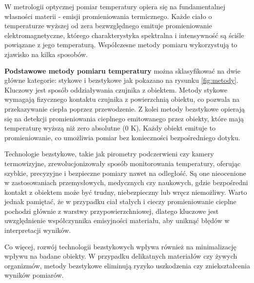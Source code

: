 \vspace{12pt}

W metrologii optycznej pomiar temperatury opiera się na fundamentalnej własności materii - emisji promieniowania termicznego. Każde ciało o temperaturze wyższej od zera bezwzględnego emituje promieniowanie elektromagnetyczne, którego charakterystyka spektralna i intensywność są ściśle powiązane z jego temperaturą. Współczesne metody pomiaru wykorzystują to zjawisko na kilka sposobów.


\vspace{12pt}

\textbf{Podstawowe metody pomiaru temperatury} można sklasyfikować na dwie główne kategorie: stykowe i bezstykowe jak pokazano na rysunku \ref{fig:metody}. Kluczowy jest sposób oddziaływania czujnika z obiektem. Metody stykowe wymagają fizycznego kontaktu czujnika z powierzchnią obiektu, co pozwala na przekazywanie ciepła poprzez przewodzenie. Z kolei metody bezstykowe opierają się na detekcji promieniowania cieplnego emitowanego przez obiekty, które mają temperaturę wyższą niż zero absolutne (0 K). Każdy obiekt emituje to promieniowanie, co umożliwia pomiar bez konieczności bezpośredniego dotyku.

\vspace{12pt}

Technologie bezstykowe, takie jak pirometry podczerwieni czy kamery termowizyjne, zrewolucjonizowały sposób monitorowania temperatury, oferując szybkie, precyzyjne i bezpieczne pomiary nawet na odległość. Są one nieocenione w zastosowaniach przemysłowych, medycznych czy naukowych, gdzie bezpośredni kontakt z obiektem może być trudny, niebezpieczny lub wręcz niemożliwy. Warto jednak pamiętać, że w przypadku ciał stałych i cieczy promieniowanie cieplne pochodzi głównie z warstwy przypowierzchniowej, dlatego kluczowe jest uwzględnienie współczynnika emisyjności materiału, aby uniknąć błędów w interpretacji wyników.

\vspace{12pt}

Co więcej, rozwój technologii bezstykowych wpływa również na minimalizację wpływu na badane obiekty. W przypadku delikatnych materiałów czy żywych organizmów, metody bezstykowe eliminują ryzyko uszkodzenia czy zniekształcenia wyników pomiarów.

